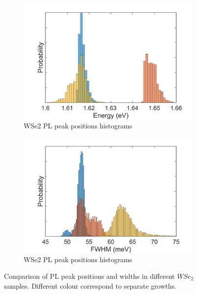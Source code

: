 \begin{figure}[!h]
	\begin{center}
		\begin{subfigure}[b]{0.45\textwidth}
			\includegraphics[width=\textwidth]{WSe2/WSe2PositionHistograms.png}
			\caption{WSe2 PL peak positions histograms}
			\label{fig:WSe2PLPositionHistograms}
		\end{subfigure}
		\qquad
		\begin{subfigure}[b]{0.45\textwidth}
			\includegraphics[width=\textwidth]{WSe2/Wse2WidthHistograms.png}
			\caption{WSe2 PL peak positions histograms}
			\label{fig:WSe2PLWidthHistograms}
		\end{subfigure}
		\caption{Comparison of PL peak positions and widths in different $WSe_2$ samples. Different colour correspond to separate growths.}
		\label{fig:WSe2PLHistograms}
	\end{center}
\end{figure}

